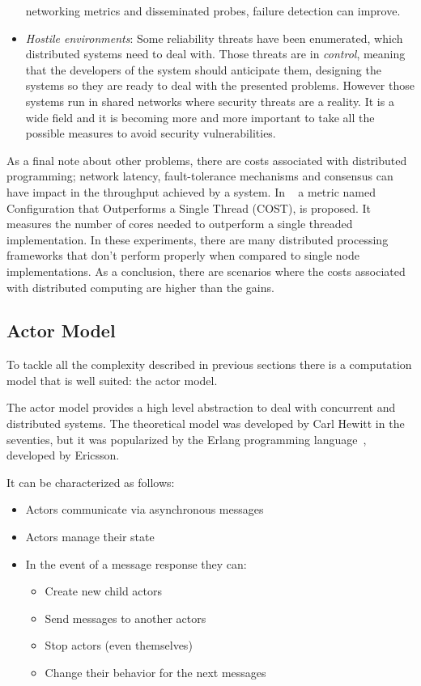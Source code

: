 \begin{itemize}
  networking metrics and disseminated probes, failure detection can improve.
\item \textit{Hostile environments}: Some reliability threats have been
  enumerated, which distributed systems need to deal with. Those threats are in
  \textit{control}, meaning that the developers of the system should anticipate
  them, designing the systems so they are ready to deal with the presented
  problems. However those systems run in shared networks where security threats
  are a reality. It is a wide field and it is becoming more and more important
  to take all the possible measures to avoid security vulnerabilities.
\end{itemize}

As a final note about other problems, there are costs associated with
distributed programming; network latency, fault-tolerance mechanisms and
consensus can have impact in the throughput achieved by a system. In
~\cite{189908} a metric named Configuration that Outperforms a Single Thread
(COST), is proposed. It measures the number of cores needed to outperform a
single threaded implementation. In these experiments, there are many distributed
processing frameworks that don't perform properly when compared to single node
implementations. As a conclusion, there are scenarios where the costs associated
with distributed computing are higher than the gains.

\subsection{Actor Model}

To tackle all the complexity described in previous sections there is a
computation model that is well suited: the actor model.

The actor model provides a high level abstraction to deal with concurrent and
distributed systems. The theoretical model was developed by Carl Hewitt in
the seventies, but it was popularized by the Erlang programming language~\cite{erlang},
developed by Ericsson.

It can be characterized as follows:
\begin{itemize}
\item Actors communicate via asynchronous messages
\item Actors manage their state
\item In the event of a message response they can:
  \begin{itemize}
  \item Create new child actors
  \item Send messages to another actors
  \item Stop actors (even themselves)
  \item Change their behavior for the next messages
  \end{itemize}
\end{itemize}

